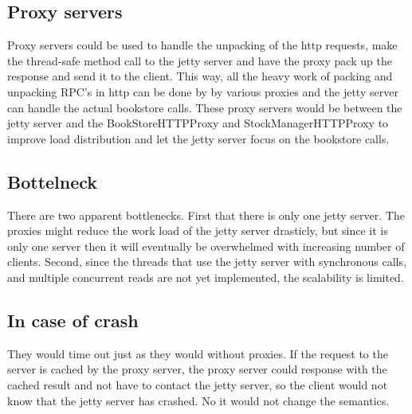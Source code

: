 \documentclass{article}
\theoremstyle{plain}
\newtheorem{claim}[equation]{Claim}
\theoremstyle{nonumberplain}
\newtheorem{proof}{Proof}
\begin{document}
\subsection{Proxy servers}

Proxy servers could be used to handle the unpacking of the http requests, make the thread-safe method call to the jetty server and have the proxy pack up the response and send it to the client. This way, all the heavy work of packing and unpacking RPC's in http can be done by by various proxies and the jetty server can handle the actual bookstore calls. These proxy servers would be between the jetty server and the BookStoreHTTPProxy and StockManagerHTTPProxy to improve load distribution and let the jetty server focus on the bookstore calls.

\subsection{Bottelneck}

There are two apparent bottlenecks. First that there is only one jetty server. The proxies might reduce the work load of the jetty server drasticly, but since it is only one server then it will eventually be overwhelmed with increasing number of clients. Second, since the threads that use the jetty server with synchronous calls, and multiple concurrent reads are not yet implemented, the scalability is limited.


\subsection{In case of crash}

They would time out just as they would without proxies. If the request to the server is cached by the proxy server, the proxy server could response with the cached result and not have to contact the jetty server, so the client would not know that the jetty server has crashed. No it would not change the semantics.



\end{document}
